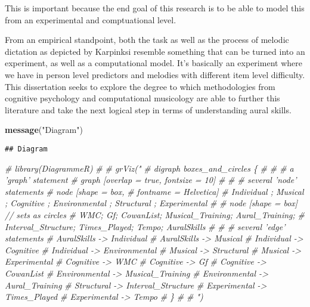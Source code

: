 \documentclass[]{book}
\newenvironment{Shaded}{\begin{snugshade}}{\end{snugshade}}
\newcommand{\CommentTok}[1]{\textcolor[rgb]{0.56,0.35,0.01}{\textit{#1}}}
\newcommand{\KeywordTok}[1]{\textcolor[rgb]{0.13,0.29,0.53}{\textbf{#1}}}
\newcommand{\NormalTok}[1]{#1}
\newcommand{\StringTok}[1]{\textcolor[rgb]{0.31,0.60,0.02}{#1}}
\theoremstyle{definition}
\theoremstyle{definition}
\theoremstyle{definition}
\theoremstyle{remark}
\begin{document}
This is important because the end goal of this research is to be able to
model this from an experimental and comptuational level.

From an empirical standpoint, both the task as well as the process of
melodic dictation as depicted by Karpinksi resemble something that can
be turned into an experiment, as well as a computational model. It's
basically an experiment where we have in person level predictors and
melodies with different item level difficulty. This dissertation seeks
to explore the degree to which methodologies from cognitive psychology
and computational musicology are able to further this literature and
take the next logical step in terms of understanding aural skills.

\begin{Shaded}
\begin{Highlighting}[]
\KeywordTok{message}\NormalTok{(}\StringTok{"Diagram"}\NormalTok{)}
\end{Highlighting}
\end{Shaded}

\begin{verbatim}
## Diagram
\end{verbatim}

\begin{Shaded}
\begin{Highlighting}[]
\CommentTok{# library(DiagrammeR)}
\CommentTok{# }
\CommentTok{# grViz("}
\CommentTok{#      digraph boxes_and_circles \{}
\CommentTok{# }
\CommentTok{#   # a 'graph' statement}
\CommentTok{#   graph [overlap = true, fontsize = 10]}
\CommentTok{# }
\CommentTok{#   # several 'node' statements}
\CommentTok{#   node [shape = box,}
\CommentTok{#         fontname = Helvetica]}
\CommentTok{#   Individual ; Musical ; Cognitive ; Environmental ; Structural ; Experimental }
\CommentTok{# }
\CommentTok{#   node [shape = box] // sets as circles}
\CommentTok{#   WMC; Gf; CowanList; Musical_Training; Aural_Training; }
\CommentTok{#   Interval_Structure; Times_Played; Tempo; AuralSkills}
\CommentTok{# }
\CommentTok{#   # several 'edge' statements}
\CommentTok{#   AuralSkills -> Individual}
\CommentTok{#   AuralSkills -> Musical}
\CommentTok{#   Individual -> Cognitive}
\CommentTok{#   Individual -> Environmental}
\CommentTok{#   Musical -> Structural}
\CommentTok{#   Musical -> Experimental}
\CommentTok{#   Cognitive -> WMC}
\CommentTok{#   Cognitive -> Gf}
\CommentTok{#   Cognitive -> CowanList}
\CommentTok{#   Environmental -> Musical_Training}
\CommentTok{#   Environmental -> Aural_Training}
\CommentTok{#   Structural -> Interval_Structure }
\CommentTok{#   Experimental -> Times_Played}
\CommentTok{#   Experimental -> Tempo}
\CommentTok{# \} }
\CommentTok{#       }
\CommentTok{#       ")}
\end{Highlighting}
\end{Shaded}
\end{document}
